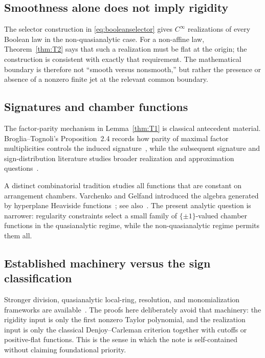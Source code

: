 \documentclass[11pt]{article}
\theoremstyle{definition}
\theoremstyle{remark}
\begin{document}
\subsection{Smoothness alone does not imply rigidity}

The selector construction in \eqref{eq:booleanselector} gives $C^\infty$ realizations of every Boolean law in the non-quasianalytic case. For a non-affine law, Theorem~\ref{thm:T2} says that such a realization must be flat at the origin; the construction is consistent with exactly that requirement. The mathematical boundary is therefore not ``smooth versus nonsmooth,'' but rather the presence or absence of a nonzero finite jet at the relevant common boundary.

\subsection{Signatures and chamber functions}
The factor-parity mechanism in Lemma~\ref{thm:T1} is classical antecedent material. Broglia--Tognoli's Proposition~2.4 records how parity of maximal factor multiplicities controls the induced signature~\cite[Proposition~2.4]{BrogliaTognoli1989}, while the subsequent signature and sign-distribution literature studies broader realization and approximation questions~\cite{Fortuna1991,AcquistapaceBroglia1992,AcquistapaceBroglia1993Correction,AcquistapaceBrogliaFortuna1994,AcquistapaceBroglia1994}.

A distinct combinatorial tradition studies all functions that are constant on arrangement chambers. Varchenko and Gelfand introduced the algebra generated by hyperplane Heaviside functions~\cite{VarchenkoGelfand1987}; see also~\cite{Moseley2017,BjornerEtAl1999}. The present analytic question is narrower: regularity constraints select a small family of $\{\pm1\}$-valued chamber functions in the quasianalytic regime, while the non-quasianalytic regime permits them all.

\subsection{Established machinery versus the sign classification}
Stronger division, quasianalytic local-ring, resolution, and monomialization frameworks are available~\cite{Thilliez2008,BierstoneMilman2004,BelottoBierstoneChow2018,BelottoBierstone2023}. The proofs here deliberately avoid that machinery: the rigidity input is only the first nonzero Taylor polynomial, and the realization input is only the classical Denjoy--Carleman criterion together with cutoffs or positive-flat functions. This is the sense in which the note is self-contained without claiming foundational priority.
\end{document}
